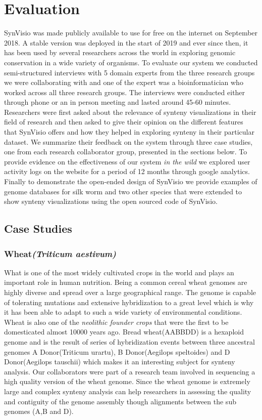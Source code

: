 \chapter{Evaluation}

SynVisio was made publicly available to use for free on the internet on September 2018. A stable version was deployed in the start of 2019 and ever since then, it has been used by several researchers across the world in exploring genomic conservation in a wide variety of organisms. To evaluate our system we conducted semi-structured interviews with 5 domain experts from the three research groups we were collaborating with and one of the expert was a bioinformatician who worked across all three research groups. The interviews were conducted either through phone or an in person meeting and lasted around 45-60 minutes. Researchers were first asked about the relevance of synteny visualizations in their field of research and then asked to give their opinion on the different features that SynVisio offers and how they helped in exploring synteny in their particular dataset. We summarize their feedback on the system through three case studies, one from each research collaborator group, presented in the sections below. To provide evidence on the effectiveness of our system \textit{in the wild} we explored user activity logs on the website for a period of 12 months through google analytics. Finally to demonstrate the open-ended design of SynVisio we provide examples of genome databases for silk worm and two other species that were extended to show synteny visualizations using the open sourced code of SynVisio.

\section{Case Studies}

\subsection{Wheat\textit{(Triticum aestivum)}}
What is one of the most widely cultivated crops in the world and plays an important role in human nutrition. Being a common cereal wheat genomes are highly diverse and spread over a large geographical range. The genome is capable of tolerating mutations and extensive hybridization to a great level which is why it has been able to adapt to such a wide variety of environmental conditions\cite{wheatinfo,10wheat}. Wheat is also one of the \textit{neolithic founder crops} that were the first to be domesticated almost 10000 years ago.
Bread wheat(AABBDD) is a hexaploid genome and is the result of series of hybridization events between three ancestral genomes A Donor(Triticum urartu), B Donor(Aegilops speltoides) and D Donor(Aegilops tauschii) which makes it an interesting subject for synteny analysis. Our collaborators were part of a research team involved in sequencing a high quality version of the wheat genome. Since the wheat genome is extremely large and complex synteny analysis can help researchers in assessing the quality and contiguity of the genome assembly though alignments between the sub genomes (A,B and D).

